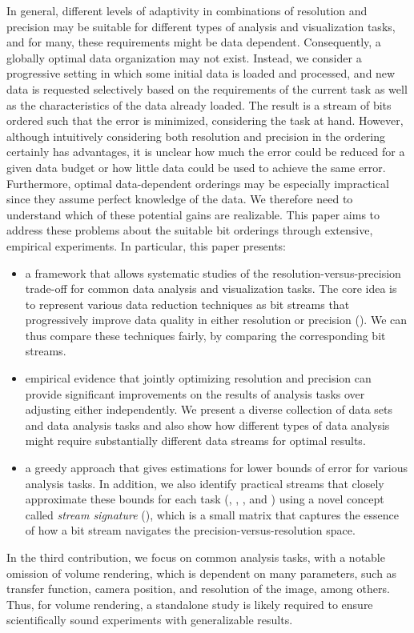 In general, different levels of adaptivity in combinations of resolution and precision may be
suitable for different types of analysis and visualization tasks, and for many, these requirements
might be data dependent. Consequently, a globally optimal data organization may not exist. Instead,
we consider a progressive setting in which some initial data is loaded and processed, and new data
is requested selectively based on the requirements of the current task as well as the
characteristics of the data already loaded. The result is a stream of bits ordered such that the
error is minimized, considering the task at hand. However, although intuitively considering both
resolution and precision in the ordering certainly has advantages, it is unclear how much the error
could be reduced for a given data budget or how little data could be used to achieve the same error.
Furthermore, optimal data-dependent orderings may be especially impractical since they assume
perfect knowledge of the data. We therefore need to understand which of these potential gains are
realizable. This paper aims to address these problems about the suitable bit orderings through
extensive, empirical experiments. In particular, this paper presents:

\begin{itemize}\dense
%
\item a framework that allows systematic studies of the resolution-versus-precision trade-off for
common data analysis and visualization tasks. The core idea is to represent various data reduction
techniques as bit streams that progressively improve data quality in either resolution or precision
(). We can thus compare these techniques fairly, by comparing the
corresponding bit streams.
%  
\item empirical evidence that jointly optimizing resolution and precision can provide significant
improvements on the results of analysis tasks over adjusting either independently. We present a
diverse collection of data sets and data analysis tasks and also show how different types of data
analysis might require substantially different data streams for optimal results.
%
\item a greedy approach that gives estimations for lower bounds of error for various analysis tasks.
In addition, we also identify practical streams that closely approximate these bounds for each task
(, , , and )
using a novel concept called \emph{stream signature} (), which is a small
matrix that captures the essence of how a bit stream navigates the precision-versus-resolution
space.
\end{itemize}

In the third contribution, we focus on common analysis tasks, with a notable omission of volume
rendering, which is dependent on many parameters, such as transfer function, camera position, and
resolution of the image, among others. Thus, for volume rendering, a standalone study is likely
required to ensure scientifically sound experiments with generalizable results.

